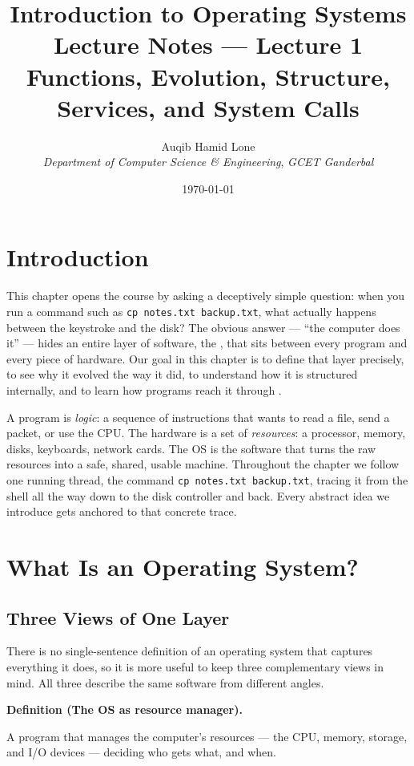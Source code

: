 \documentclass[11pt]{article}
\title{Introduction to Operating Systems\\\large Lecture Notes --- Lecture 1\\
  \normalsize Functions, Evolution, Structure, Services, and System Calls}
\author{Auqib Hamid Lone\\[0.3em]
  \emph{Department of Computer Science \& Engineering}, \emph{GCET Ganderbal}}
\date{\today}
\newenvironment{definitionbox}[1]{%
  \par\noindent\textbf{Definition (#1).}\ \itshape
}{\par\vspace{0.3em}}
\begin{document}
\maketitle

\section{Introduction}

This chapter opens the course by asking a deceptively simple question: when you run a command such as \texttt{cp notes.txt backup.txt}, what actually happens between the keystroke and the disk? The obvious answer --- ``the computer does it'' --- hides an entire layer of software, the , that sits between every program and every piece of hardware. Our goal in this chapter is to define that layer precisely, to see why it evolved the way it did, to understand how it is structured internally, and to learn how programs reach it through .

A program is \emph{logic}: a sequence of instructions that wants to read a file, send a packet, or use the CPU. The hardware is a set of \emph{resources}: a processor, memory, disks, keyboards, network cards. The OS is the software that turns the raw resources into a safe, shared, usable machine. Throughout the chapter we follow one running thread, the command \texttt{cp notes.txt backup.txt}, tracing it from the shell all the way down to the disk controller and back. Every abstract idea we introduce gets anchored to that concrete trace.

\section{What Is an Operating System?}

\subsection{Three Views of One Layer}

There is no single-sentence definition of an operating system that captures everything it does, so it is more useful to keep three complementary views in mind. All three describe the same software from different angles.

\begin{definitionbox}{The OS as resource manager}
A program that manages the computer's resources --- the CPU, memory, storage, and I/O devices --- deciding who gets what, and when.
\end{definitionbox}
\end{document}
